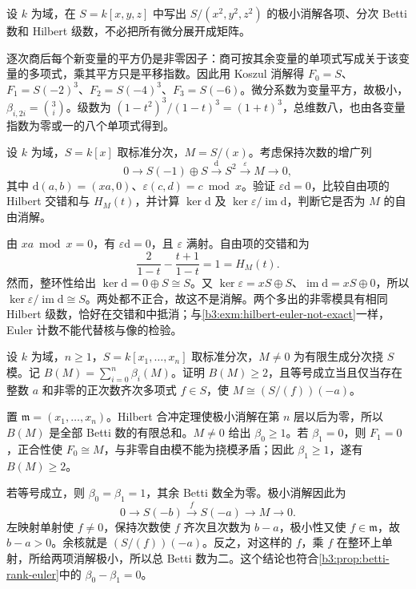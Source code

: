 \begin{exercise}\label{b3:ex:21-cubic-powers}
	设 \(k\) 为域，在 \(S=k[x,y,z]\) 中写出 \(S/(x^2,y^2,z^2)\) 的极小消解各项、分次 Betti 数和 Hilbert 级数，不必把所有微分展开成矩阵。
\end{exercise}
\begin{solution}
	逐次商后每个新变量的平方仍是非零因子：商可按其余变量的单项式写成关于该变量的多项式，乘其平方只是平移指数。因此用 Koszul 消解得 \(F_0=S\)、\(F_1=S(-2)^3\)、\(F_2=S(-4)^3\)、\(F_3=S(-6)\)。微分系数为变量平方，故极小，\(\beta_{i,2i}=\binom3i\)。级数为 \((1-t^2)^3/(1-t)^3=(1+t)^3\)，总维数八，也由各变量指数为零或一的八个单项式得到。
\end{solution}

\begin{exercise}\label{b3:ex:21-cancel-hilbert-not-exact}
	设 \(k\) 为域，\(S=k[x]\) 取标准分次，\(M=S/(x)\)。考虑保持次数的增广列
	\[
		0\longrightarrow S(-1)\oplus S\xrightarrow{\mathrm{d}}S^2 \xrightarrow{\varepsilon}M\longrightarrow0,
	\]
	其中 \(\mathrm{d}(a,b)=(xa,0)\)、\(\varepsilon(c,d)=c\bmod x\)。验证 \(\varepsilon\mathrm{d}=0\)，比较自由项的 Hilbert 交错和与 \(H_M(t)\)，并计算 \(\ker\mathrm{d}\) 及 \(\ker\varepsilon/\operatorname{im}\mathrm{d}\)，判断它是否为 \(M\) 的自由消解。
\end{exercise}
\begin{solution}
	由 \(xa\bmod x=0\)，有 \(\varepsilon\mathrm{d}=0\)，且 \(\varepsilon\) 满射。自由项的交错和为
	\[
		\frac{2}{1-t}-\frac{t+1}{1-t}=1=H_M(t).
	\]
	然而，整环性给出 \(\ker\mathrm{d}=0\oplus S\cong S\)。又 \(\ker\varepsilon=xS\oplus S\)、\(\operatorname{im}\mathrm{d}=xS\oplus0\)，所以 \(\ker\varepsilon/\operatorname{im}\mathrm{d}\cong S\)。两处都不正合，故这不是消解。两个多出的非零模具有相同 Hilbert 级数，恰好在交错和中抵消；与\cref{b3:exm:hilbert-euler-not-exact}一样，Euler 计数不能代替核与像的检验。
\end{solution}

\begin{exercise}\label{b3:ex:21-rank-euler}
	设 \(k\) 为域，\(n\ge1\)，\(S=k[x_1,\ldots,x_n]\) 取标准分次，\(M\ne0\) 为有限生成分次挠 \(S\) 模。记 \(B(M)=\sum_{i=0}^n\beta_i(M)\)。证明 \(B(M)\ge2\)，且等号成立当且仅当存在整数 \(a\) 和非零的正次数齐次多项式 \(f\in S\)，使 \(M\cong(S/(f))(-a)\)。
\end{exercise}
\begin{solution}
	置 \(\mathfrak m=(x_1,\ldots,x_n)\)。Hilbert 合冲定理使极小消解在第 \(n\) 层以后为零，所以 \(B(M)\) 是全部 Betti 数的有限总和。\(M\ne0\) 给出 \(\beta_0\ge1\)。若 \(\beta_1=0\)，则 \(F_1=0\)，正合性使 \(F_0\cong M\)，与非零自由模不能为挠模矛盾；因此 \(\beta_1\ge1\)，遂有 \(B(M)\ge2\)。

	若等号成立，则 \(\beta_0=\beta_1=1\)，其余 Betti 数全为零。极小消解因此为
	\[
		0\longrightarrow S(-b)\xrightarrow{f}S(-a) \longrightarrow M\longrightarrow0.
	\]
	左映射单射使 \(f\ne0\)，保持次数使 \(f\) 齐次且次数为 \(b-a\)，极小性又使 \(f\in\mathfrak m\)，故 \(b-a>0\)。余核就是 \((S/(f))(-a)\)。反之，对这样的 \(f\)，乘 \(f\) 在整环上单射，所给两项消解极小，所以总 Betti 数为二。这个结论也符合\cref{b3:prop:betti-rank-euler}中的 \(\beta_0-\beta_1=0\)。
\end{solution}


